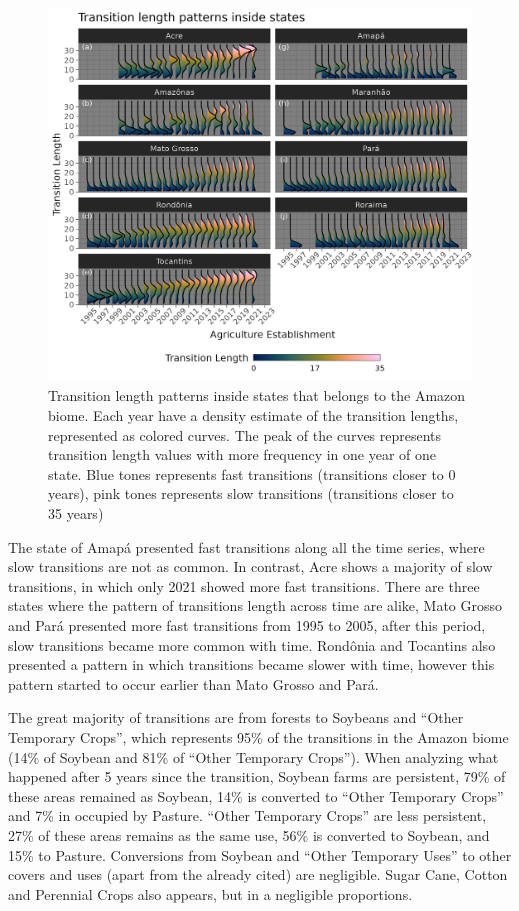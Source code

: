 \documentclass[essd, manuscript]{copernicus}
\begin{document}
\begin{figure}[ht]
\includegraphics[width=17cm]{figs/trans_ridge} \caption{Transition length patterns inside states that belongs to the Amazon biome. Each year have a density estimate of the transition lengths, represented as colored curves. The peak of the curves represents transition length values with more frequency in one year of one state. Blue tones represents fast transitions (transitions closer to 0 years), pink tones represents slow transitions (transitions closer to 35 years)}\label{fig:transridge-plot}
\end{figure}

The state of Amapá presented fast transitions along all the time series, where slow transitions are not as common.
In contrast, Acre shows a majority of slow transitions, in which only 2021 showed more fast transitions.
There are three states where the pattern of transitions length across time are alike, Mato Grosso and Pará presented more fast transitions from 1995 to 2005, after this period, slow transitions became more common with time.
Rondônia and Tocantins also presented a pattern in which transitions became slower with time, however this pattern started to occur earlier than Mato Grosso and Pará.

The great majority of transitions are from forests to Soybeans and ``Other Temporary Crops'', which represents 95\% of the transitions in the Amazon biome (14\% of Soybean and 81\% of ``Other Temporary Crops'').
When analyzing what happened after 5 years since the transition, Soybean farms are persistent, 79\% of these areas remained as Soybean, 14\% is converted to ``Other Temporary Crops'' and 7\% in occupied by Pasture.
``Other Temporary Crops'' are less persistent, 27\% of these areas remains as the same use, 56\% is converted to Soybean, and 15\% to Pasture.
Conversions from Soybean and ``Other Temporary Uses'' to other covers and uses (apart from the already cited) are negligible.
Sugar Cane, Cotton and Perennial Crops also appears, but in a negligible proportions.
\end{document}
